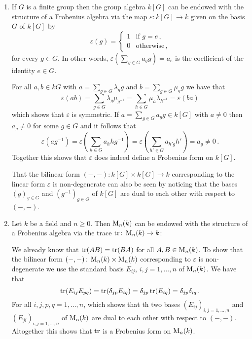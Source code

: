 \begin{example}
  \leavevmode
  \begin{enumerate}
    \item
      If $G$ is a finite group then the group algebra $k[G]$ can be endowed with the structure of a Frobenius algebra via the map $\varepsilon \colon k[G] \to k$ given on the basis $G$ of $k[G]$ by
      \[
          \varepsilon(g)
        = \begin{cases}
            1 & \text{if $g = e$} \,, \\
            0 & \text{otherwise}  \,,
          \end{cases}
      \]
      for every $g \in G$.
      In other words, $\varepsilon(\sum_{g \in G} a_g g) = a_e$ is the coefficient of the identity $e \in G$.
      
      For all $a, b \in kG$ with $a = \sum_{g \in G} \lambda_g g$ and $b = \sum_{g \in G} \mu_g g$ we have that
      \[
          \varepsilon(ab)
        = \sum_{g \in G} \lambda_g \mu_{g^{-1}}
        = \sum_{h \in G} \mu_h \lambda_{h^{-1}}
        = \varepsilon(ba)
      \]
      which shows that $\varepsilon$ is symmetric.
      If $a = \sum_{g \in G} a_g g \in k[G]$ with $a \neq 0$ then $a_g \neq 0$ for some $g \in G$ and it follows that
      \[
              \varepsilon(a g^{-1})
        =     \varepsilon\left( \sum_{h \in G} a_h h g^{-1} \right)
        =     \varepsilon\left( \sum_{h' \in G} a_{h' g} h' \right)
        =     a_g
        \neq  0 \,.
      \]
      Together this shows that $\varepsilon$ does indeed define a Frobenius form on $k[G]$.
      
      That the bilinear form $(-,-) \colon k[G] \times k[G] \to k$ corresponding to the linear form $\varepsilon$ is non-degenerate can also be seen by noticing that the bases $(g)_{g \in G}$ and $(g^{-1})_{g \in G}$ of $k[G]$ are dual to each other with respect to $(-,-)$.
    \item
      Let $k$ be a field and $n \geq 0$.
      Then $\operatorname{M}_n(k)$ can be endowed with the structure of a Frobenius algebra via the trace $\operatorname{tr} \colon \operatorname{M}_n(k) \to k$:
      
      We already know that $\operatorname{tr}(AB) = \operatorname{tr}(BA)$ for all $A, B \in \operatorname{M}_n(k)$.
      To show that the bilinear form $(-,-) \colon \operatorname{M}_n(k) \times \operatorname{M}_n(k)$ corresponding to $\varepsilon$ is non-degenerate we use the standard basis $E_{ij}$, $i,j = 1, \dotsc, n$ of $\operatorname{M}_n(k)$.
      We have that
      \[
          \operatorname{tr}( E_{ij} E_{pq} )
        = \operatorname{tr}( \delta_{jp} E_{iq} )
        = \delta_{jp} \operatorname{tr}(E_{iq})
        = \delta_{jp} \delta_{iq} \,.
      \]
      For all $i,j,p,q = 1, \dotsc, n$, which shows that th two bases $(E_{ij})_{i,j=1,\dotsc,n}$ and $(E_{ji})_{i,j=1, \dotsc, n}$ of $\operatorname{M}_n(k)$ are dual to each other with respect to $(-,-)$.
      Altogether this shows that $\operatorname{tr}$ is a Frobenius form on $\operatorname{M}_n(k)$.
  \end{enumerate}
\end{example}


